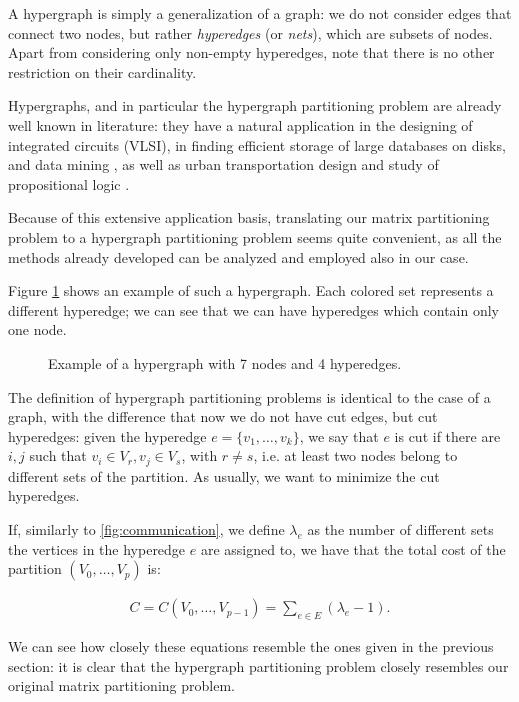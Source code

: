 A hypergraph is simply a generalization of a graph: we do not consider edges that connect two nodes, but rather \emph{hyperedges} (or \emph{nets}), which are subsets of nodes. Apart from considering only non-empty hyperedges, note that there is no other restriction on their cardinality.

Hypergraphs, and in particular the hypergraph partitioning problem are already well known in literature: they have a natural application in the designing of integrated circuits (VLSI), in finding efficient storage of large databases on disks, and data mining \cite{vlsi}, as well as urban transportation design and study of propositional logic \cite{papa_hypergraph}.

Because of this extensive application basis, translating our matrix partitioning problem to a hypergraph partitioning problem seems quite convenient, as all the methods already developed can be analyzed and employed also in our case.

Figure \ref{fig:hypergraph} shows an example of such a hypergraph. Each colored set represents a different hyperedge; we can see that we can have hyperedges which contain only one node.

\begin{figure}[h]
	\centering
	\caption{Example of a hypergraph with 7 nodes and 4 hyperedges.}
	\label{fig:hypergraph}
\end{figure}

The definition of hypergraph partitioning problems is identical to the case of a graph, with the difference that now we do not have cut edges, but cut hyperedges: given the hyperedge $e=\{v_1,\dots,v_k\}$, we say that $e$ is cut if there are $i,j$ such that $v_i \in V_r, v_j \in V_s$, with $r \neq s$, i.e. at least two nodes belong to different sets of the partition. As usually, we want to minimize the cut hyperedges.

If, similarly to \eqref{fig:communication}, we define $\lambda_e$ as the number of different sets the vertices in the hyperedge $e$ are assigned to, we have that the total cost of the partition $(V_0,\dots,V_p)$ is:

\begin{align}
	C = C(V_0,\dots,V_{p-1}) = \sum_{e \in E} (\lambda_e -1).
	\label{eq:cost_hypergraph}
\end{align}

We can see how closely these equations resemble the ones given in the previous section: it is clear that the hypergraph partitioning problem closely resembles our original matrix partitioning problem.

